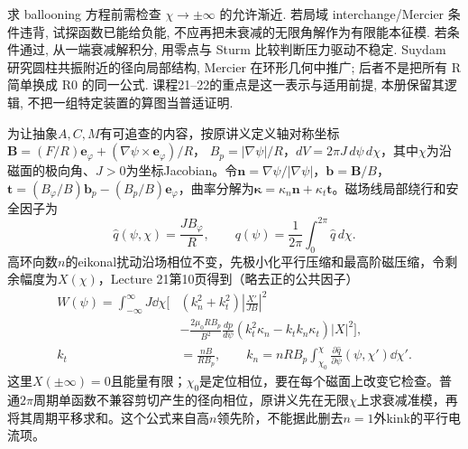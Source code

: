 求 ballooning 方程前需检查 \ensuremath{\chi}\ensuremath{\to}\ensuremath{\pm}\ensuremath{\infty} 的允许渐近. 若局域 interchange/Mercier 条件违背, 试探函数已能给负能, 不应再把未衰减的无限角解作为有限能本征模. 若条件通过, 从一端衰减解积分, 用零点与 Sturm 比较判断压力驱动不稳定. Suydam 研究圆柱共振附近的径向局部结构, Mercier 在环形几何中推广; 后者不是把所有 R 简单换成 R0 的同一公式. 课程21--22的重点是这一表示与适用前提, 本册保留其逻辑, 不把一组特定装置的算图当普适证明.

为让抽象$A,C,M$有可追查的内容，按原讲义定义轴对称坐标
$\mathbf B=(F/R)\mathbf e_\varphi+(\nabla\psi\times\mathbf e_\varphi)/R$，
$B_p=|\nabla\psi|/R$，$dV=2\pi J\,d\psi\,d\chi$，其中$\chi$为沿磁面的极向角、$J>0$为坐标Jacobian。令$\mathbf n=\nabla\psi/|\nabla\psi|$，$\mathbf b=\mathbf B/B$，
$\mathbf t=(B_\varphi/B)\mathbf b_p-(B_p/B)\mathbf e_\varphi$，曲率分解为$\boldsymbol\kappa=\kappa_n\mathbf n+\kappa_t\mathbf t$。磁场线局部绕行和安全因子为
\begin{equation}
\widehat q(\psi,\chi)=\frac{JB_\varphi}{R},\qquad
q(\psi)=\frac1{2\pi}\int_0^{2\pi}\widehat q\,d\chi .
\end{equation}
高环向数$n$的eikonal扰动沿场相位不变，先极小化平行压缩和最高阶磁压缩，令剩余幅度为$X(\chi)$，Lecture 21第10页得到（略去正的公共因子）
\begin{equation}
\begin{split}
W(\psi)=\int_{-\infty}^{\infty}J\dd\chi\Bigg[
&(k_n^2+k_t^2)\left|\frac{X'}{JB}\right|^2\\
&-\frac{2\mu_0RB_p}{B^2}\frac{dp}{d\psi}
(k_t^2\kappa_n-k_tk_n\kappa_t)|X|^2\Bigg],\\
k_t&=\frac{nB}{RB_p},\qquad
k_n=nRB_p\int_{\chi_0}^{\chi}
\frac{\partial\widehat q}{\partial\psi}(\psi,\chi')\dd\chi'.
\end{split}
\end{equation}
这里$X(\pm\infty)=0$且能量有限；$\chi_0$是定位相位，要在每个磁面上改变它检查。普通$2\pi$周期单函数不兼容剪切产生的径向相位，原讲义先在无限$\chi$上求衰减准模，再将其周期平移求和。这个公式来自高$n$领先阶，不能据此删去$n=1$外kink的平行电流项。

